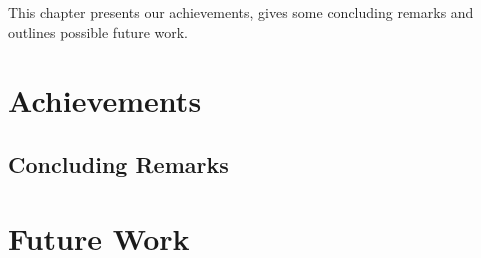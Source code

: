 This chapter presents our achievements, gives some concluding remarks and outlines possible future work.

\section{Achievements}


\subsection{Concluding Remarks}


\section{Future Work}

